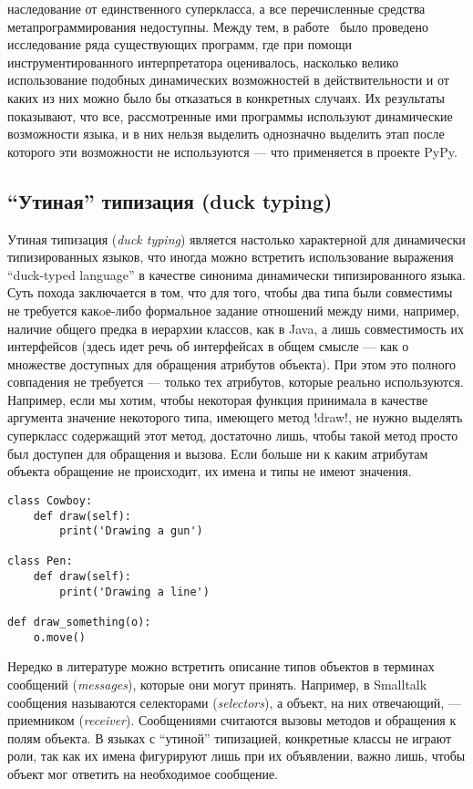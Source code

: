 \begin{itemize}
{      наследование от единственного суперкласса, а все перечисленные средства
      метапрограммирования недоступны.  Между тем, в работе~\cite{Holkner2009} было проведено
      исследование ряда существующих программ, где при помощи инструментированного
      интерпретатора оценивалось, насколько велико использование подобных
      динамических возможностей в действительности и от каких из них можно было бы
      отказаться в конкретных случаях. Их результаты показывают, что все,
      рассмотренные ими программы используют динамические возможности языка, и в них
      нельзя выделить однозначно выделить этап после которого эти возможности не
      используются --- что применяется в проекте PyPy.
    }
\end{itemize}

\subsection{``Утиная'' типизация (duck typing)}

Утиная типизация (\emph{duck typing}) является настолько характерной для динамически
типизированных языков, что иногда можно встретить использование
выражения ``duck-typed language'' в качестве синонима динамически типизированного
языка. Суть похода заключается в том, что для того, чтобы два типа были
совместимы не требуется какoе-либо формальное задание отношений между ними,
например, наличие общего предка в иерархии классов, как в Java, а лишь совместимость их
интерфейсов (здесь идет речь об интерфейсах в общем смысле --- как о множестве
доступных для обращения атрибутов объекта). При этом это полного совпадения не
требуется --- только тех атрибутов, которые реально используются. 
Например, если мы хотим, чтобы некоторая функция принимала в
качестве аргумента значение некоторого типа, имеющего метод !draw!, не нужно
выделять суперкласс содержащий этот метод, достаточно лишь, чтобы такой метод
просто был доступен для обращения и вызова. Если больше ни к каким атрибутам
объекта обращение не происходит, их имена и типы не имеют значения.

\pagebreak
\begin{lstlisting}
class Cowboy:
    def draw(self):
        print('Drawing a gun')

class Pen:
    def draw(self):
        print('Drawing a line')

def draw_something(o):
    o.move()
\end{lstlisting}

Нередко в литературе можно встретить описание типов объектов в терминах
сообщений (\emph{messages}), которые они могут принять. Например, в Smalltalk
сообщения называются селекторами (\emph{selectors}), а объект, на них отвечающий, ---
приемником (\emph{receiver}). Сообщениями считаются вызовы методов и обращения к полям
объекта. В языках с ``утиной'' типизацией, конкретные классы не играют роли, так
как их имена фигурируют лишь при их объявлении, важно лишь, чтобы объект мог
ответить на необходимое сообщение.  

